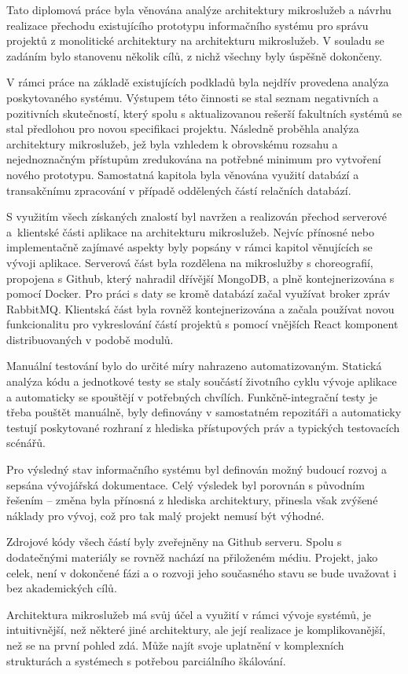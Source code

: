 Tato diplomová práce byla věnována analýze architektury mikroslužeb a návrhu realizace přechodu existujícího prototypu informačního systému pro správu projektů z monolitické architektury na architekturu mikroslužeb.
V souladu se zadáním bylo stanovenu několik cílů, z nichž všechny byly úspěšně dokončeny.

V rámci práce na základě existujících podkladů byla nejdřív provedena analýza poskytovaného systému.
Výstupem této činnosti se stal seznam negativních a pozitivních skutečností, který spolu s aktualizovanou rešerší fakultních systémů se stal předlohou pro novou specifikaci projektu.
Následně proběhla analýza architektury mikroslužeb, jež byla vzhledem k obrovskému rozsahu a nejednoznačným přístupům zredukována na potřebné minimum pro vytvoření nového prototypu.
Samostatná kapitola byla věnována využití databází a transakčnímu zpracování v případě oddělených částí relačních databází.

S využitím všech získaných znalostí byl navržen a realizován přechod serverové a~klientské části aplikace na architekturu mikroslužeb.
Nejvíc přínosné nebo implementačně zajímavé aspekty byly popsány v rámci kapitol věnujících se vývoji aplikace.
Serverová část byla rozdělena na mikroslužby s choreografií, propojena s Github, který nahradil dřívější MongoDB, a plně kontejnerizována s pomocí Docker.
Pro práci s daty se kromě databází začal využívat broker zpráv RabbitMQ\@.
Klientská část byla rovněž kontejnerizována a začala používat novou funkcionalitu pro vykreslování částí projektů s pomocí vnějších React komponent distribuovaných v podobě  modulů.

Manuální testování bylo do určité míry nahrazeno automatizovaným.
Statická analýza kódu a jednotkové testy se staly součástí životního cyklu vývoje aplikace a automaticky se spouštějí v potřebných chvílích.
Funkčně-integrační testy je třeba pouštět manuálně, byly definovány v samostatném repozitáři a automaticky testují poskytované rozhraní z hlediska přístupových práv a typických testovacích scénářů.

Pro výsledný stav informačního systému byl definován možný budoucí rozvoj a sepsána vývojářská dokumentace.
Celý výsledek byl porovnán s původním řešením – změna byla přínosná z hlediska architektury, přinesla však zvýšené náklady pro vývoj, což pro tak malý projekt nemusí být výhodné.

Zdrojové kódy všech částí  byly zveřejněny na Github serveru.
Spolu s dodatečnými materiály se rovněž nachází na přiloženém médiu.
Projekt, jako celek, není v dokončené fázi a o rozvoji jeho současného stavu se bude uvažovat i bez akademických cílů.

Architektura mikroslužeb má svůj účel a využití v rámci vývoje systémů, je intuitivnější, než některé jiné architektury, ale její realizace je komplikovanější, než se na první pohled zdá.
Může najít svoje uplatnění v komplexních strukturách a systémech s potřebou parciálního škálování.
